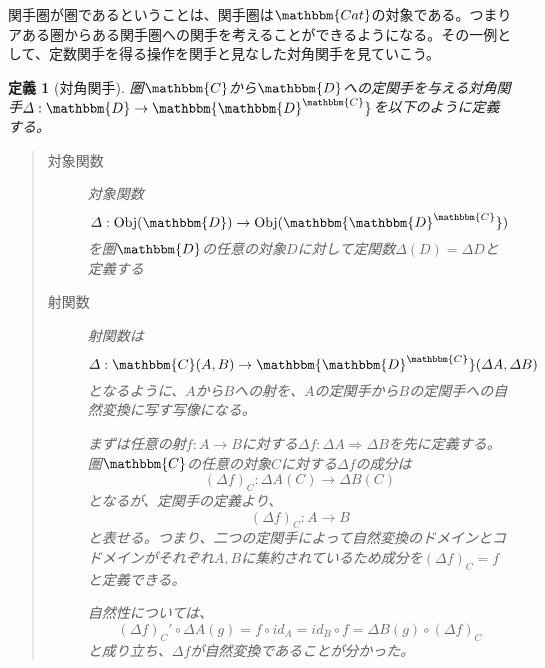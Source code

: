 \documentclass[uplatex,dvipdfmx]{jsarticle}
\newcommand{\cat}[1]{\mathbbm{#1}}
\newcommand{\arrow}{\rightarrow}
\newcommand{\functor}[3]{#1:\cat{#2}\arrow \cat{#3}}
\newcommand{\nat}[3]{#1:#2\Rightarrow #3}
\newcommand{\obj}[1]{\mathrm{Obj}(\cat{#1})}
\newcommand{\mor}[3]{#1:#2\arrow #3}
\newcommand{\arset}[3]{\cat{#1}(#2,#3)}
\newcommand{\funccat}[2]{\cat{#2}^\cat{#1}}
\newtheorem{define}{定義}[section]
\numberwithin{proof}{subsection}
\numberwithin{prop}{subsection}
\numberwithin{define}{subsection}
\begin{document}
  関手圏が圏であるということは、関手圏は$\cat{Cat}$の対象である。つまりアある圏からある関手圏への関手を考えることができるようになる。その一例として、定数関手を得る操作を関手と見なした対角関手を見ていこう。
  \begin{define}[対角関手]
    圏$\cat{C}$から$\cat{D}$への定関手を与える対角関手$\functor{\varDelta}{D}{\funccat{C}{D}}$を以下のように定義する。
    \begin{quote}
			\begin{description}
				\item[対象関数] 対象関数\[\mor{\varDelta}{\obj{D}}{\obj{\funccat{C}{D}}}\]
				を圏$\cat{D}$の任意の対象$D$に対して定関数$\varDelta(D)=\varDelta D$と定義する 
				\item[射関数] 
        射関数は\[\mor{\varDelta}{\arset{C}{A}{B}}{\arset{\funccat{C}{D}}{\varDelta A}{\varDelta B}}\]となるように、$A$から$B$への射を、$A$の定関手から$B$の定関手への自然変換に写す写像になる。

        まずは任意の射$\mor{f}{A}{B}$に対する$\nat{\varDelta f}{\varDelta A}{\varDelta B}$を先に定義する。
        圏$\cat{C}$の任意の対象$C$に対する$\varDelta f$の成分は\[\mor{(\varDelta f)_C}{\varDelta A(C)}{\varDelta B(C)}\]となるが、定関手の定義より、\[\mor{(\varDelta f)_C}{A}{B}\]と表せる。つまり、二つの定関手によって自然変換のドメインとコドメインがそれぞれ$A,B$に集約されているため成分を$(\varDelta f)_C=f$と定義できる。

        自然性については、\[(\varDelta f)_C'\circ\varDelta A(g)=f\circ id_A=id_B\circ f=\varDelta B(g)\circ(\varDelta f)_C\]と成り立ち、$\varDelta f$が自然変換であることが分かった。

        \begin{center}
\end{center}
\end{description}
\end{quote}
\end{define}
\end{document}
